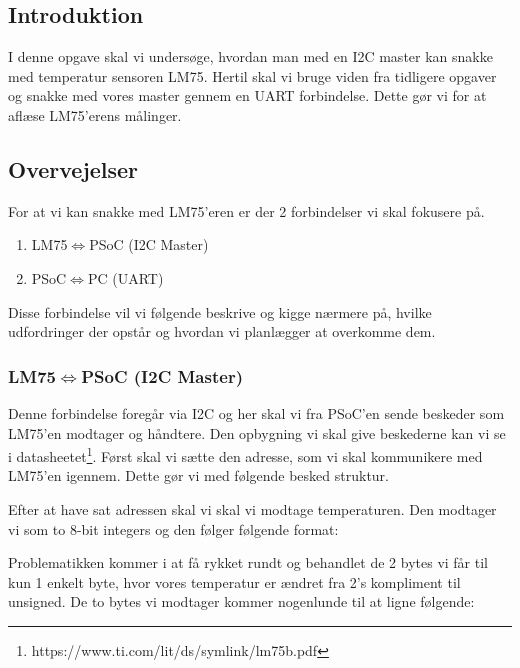 \documentclass[../main.tex]{subfiles}
\begin{document}
\subsection{Introduktion}
I denne opgave skal vi undersøge, hvordan man med en I2C master kan snakke med temperatur sensoren LM75.
Hertil skal vi bruge viden fra tidligere opgaver og snakke med vores master gennem en UART forbindelse. 
Dette gør vi for at aflæse LM75'erens målinger.

\subsection{Overvejelser}
For at vi kan snakke med LM75'eren er der 2 forbindelser vi skal fokusere på.
\begin{enumerate}
    \item LM75$\iff$PSoC (I2C Master)
    \item PSoC$\iff$PC (UART)
\end{enumerate}
Disse forbindelse vil vi følgende beskrive og kigge nærmere på, hvilke udfordringer der opstår og hvordan vi planlægger at overkomme dem.

\subsubsection{LM75$\iff$PSoC (I2C Master)} \label{sec:i2cmaster}
Denne forbindelse foregår via I2C og her skal vi fra PSoC'en sende beskeder som LM75'en modtager og håndtere. Den opbygning vi skal give beskederne kan vi se i datasheetet\footnote{https://www.ti.com/lit/ds/symlink/lm75b.pdf}.
Først skal vi sætte den adresse, som vi skal kommunikere med LM75'en igennem. Dette gør vi med følgende besked struktur.

Efter at have sat adressen skal vi skal vi modtage temperaturen. Den modtager vi som to 8-bit integers og den følger følgende format:

Problematikken kommer i at få rykket rundt og behandlet de 2 bytes vi får til kun 1 enkelt byte, hvor vores temperatur er ændret fra 2's kompliment til unsigned.
De to bytes vi modtager kommer nogenlunde til at ligne følgende:
\end{document}

